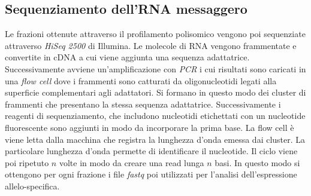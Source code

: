 \subsection{Sequenziamento dell'RNA messaggero}
Le frazioni ottenute attraverso il profilamento polisomico vengono poi sequenziate attraverso \emph{HiSeq 2500} di Illumina.
Le molecole di RNA vengono frammentate e convertite in cDNA a cui viene aggiunta una sequenza adattatrice.
Successivamente avviene un'amplificazione con \emph{PCR} i cui risultati sono caricati in una \emph{flow cell} dove i frammenti sono catturati da oligonucleotidi legati alla superficie complementari agli adattatori.
Si formano in questo modo dei cluster di frammenti che presentano la stessa sequenza adattatrice.
Successivamente i reagenti di sequenziamento, che includono nucleotidi etichettati con un nucleotide fluorescente sono aggiunti in modo da incorporare la prima base.
La flow cell \`e viene letta dalla macchina che registra la lunghezza d'onda emessa dai cluster.
La particolare lunghezza d'onda permette di identificare il nucleotide.
Il ciclo viene poi ripetuto $n$ volte in modo da creare una read lunga $n$ basi.
In questo modo si ottengono per ogni frazione i file \emph{fastq} poi utilizzati per l'analisi dell'espressione allelo-specifica.
